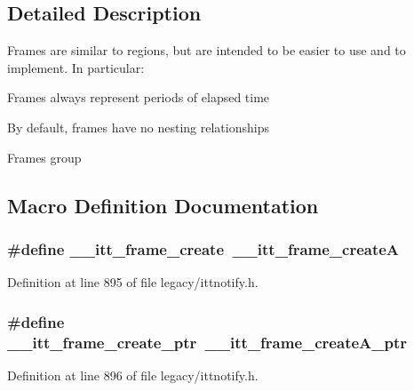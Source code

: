 \subsection{Detailed Description}
Frames are similar to regions, but are intended to be easier to use and to implement. In particular\-:
\begin{DoxyItemize}
\item Frames always represent periods of elapsed time
\item By default, frames have no nesting relationships
\end{DoxyItemize}

Frames group 

\subsection{Macro Definition Documentation}
\hypertarget{group__frames_ga0f3e51aaf74b13975eec5f29533cc442}{
\subsubsection[{\-\_\-\-\_\-itt\-\_\-frame\-\_\-create}]{\setlength{\rightskip}{0pt plus 5cm}\#define \-\_\-\-\_\-itt\-\_\-frame\-\_\-create~{\bf \-\_\-\-\_\-itt\-\_\-frame\-\_\-create\-A}}}\label{group__frames_ga0f3e51aaf74b13975eec5f29533cc442}


Definition at line 895 of file legacy/ittnotify.\-h.

\hypertarget{group__frames_ga45e4c9f633e550e222d510aef5616283}{
\subsubsection[{\-\_\-\-\_\-itt\-\_\-frame\-\_\-create\-\_\-ptr}]{\setlength{\rightskip}{0pt plus 5cm}\#define \-\_\-\-\_\-itt\-\_\-frame\-\_\-create\-\_\-ptr~\-\_\-\-\_\-itt\-\_\-frame\-\_\-create\-A\-\_\-ptr}}\label{group__frames_ga45e4c9f633e550e222d510aef5616283}


Definition at line 896 of file legacy/ittnotify.\-h.



